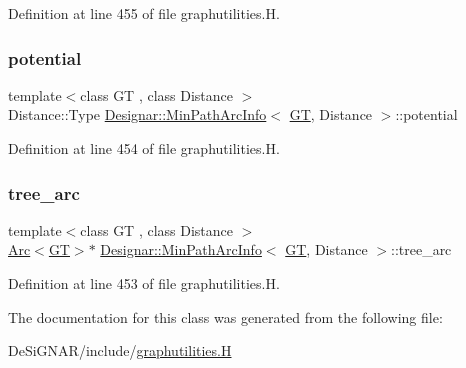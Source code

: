 Definition at line 455 of file graphutilities.\+H.

\mbox{\label{class_designar_1_1_min_path_arc_info_ae53cddd12f7488ab3daf3711963b533d}} 
\subsubsection{\texorpdfstring{potential}{potential}}
{\footnotesize\ttfamily template$<$class GT , class Distance $>$ \\
Distance\+::\+Type \hyperlink{class_designar_1_1_min_path_arc_info}{Designar\+::\+Min\+Path\+Arc\+Info}$<$ \hyperlink{demo-buildgraph_8_c_a3001c40d2c31ca87ed96cd7d1334a55e}{GT}, Distance $>$\+::potential}



Definition at line 454 of file graphutilities.\+H.

\mbox{\label{class_designar_1_1_min_path_arc_info_a2f5c165e547c75ec582dd3724a93137c}} 
\subsubsection{\texorpdfstring{tree\+\_\+arc}{tree\_arc}}
{\footnotesize\ttfamily template$<$class GT , class Distance $>$ \\
\hyperlink{namespace_designar_a3f55fb5513d62ff47cbc8f72b8e95d6f}{Arc}$<$\hyperlink{demo-buildgraph_8_c_a3001c40d2c31ca87ed96cd7d1334a55e}{GT}$>$$\ast$ \hyperlink{class_designar_1_1_min_path_arc_info}{Designar\+::\+Min\+Path\+Arc\+Info}$<$ \hyperlink{demo-buildgraph_8_c_a3001c40d2c31ca87ed96cd7d1334a55e}{GT}, Distance $>$\+::tree\+\_\+arc}



Definition at line 453 of file graphutilities.\+H.



The documentation for this class was generated from the following file\+:\begin{DoxyCompactItemize}
\item 
De\+Si\+G\+N\+A\+R/include/\hyperlink{graphutilities_8_h}{graphutilities.\+H}\end{DoxyCompactItemize}

